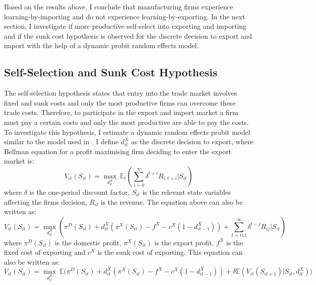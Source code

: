 \documentclass[12pt]{article}
\begin{document}
Based on the results above,  I conclude that manufacturing firms experience learning-by-importing and
do not experience learning-by-exporting. 
In the next section, I investigate if more productive self-select into
exporting and importing and if the sunk cost hypothesis is observed for
the discrete decision to export and import with the help of a dynamic probit
random effects model. 
\newpage
\subsection{Self-Selection and Sunk Cost Hypothesis }\label{sec:ss}
The self-selection hypothesis states that entry into the trade market
involves fixed and sunk costs and only the most productive firms can
overcome these trade costs. Therefore, to participate in the
export and import market a firm must pay a certain costs and only the most
productive are able to pay the costs. To investigate this hypothesis, I
estimate a dynamic random effects probit model similar to the model used
in \textcite{roberts1997decision}. I define $d_{it}^{X}$ as the discrete
decision to export, where
 Bellman equation for a profit maximising firm deciding to enter the
 export market is:
\begin{equation}
V_{it}(S_{it})= \underset{d_{it}^{X}}{\max}\:  \mathbb{E}_{t}(\sum_{i=0}^{\infty} \delta^{t+i}R_{i,t+i}|S_{it})
\end{equation}
 where $\delta$ is the one-period discount factor, $S_{it}$ is the
 relevant state variables affecting the firms decision, $R_{it}$ is
 the revenue. The equation above can also be written as:
\begin{equation}
V_{it}(S_{it})= \underset{d_{it}^{X}}{\max} (\pi^{D}(S_{it}) + d_{it}^{X}(\pi^{X}(S_{it})- f^{X} -
c^{X}(1-d_{it-1}^{X}))  + \sum_{t=t11}^{\infty} \delta^{t-j}R_{ij}|S_{it})
\end{equation}
where $\pi^{D}(S_{it})$ is the domestic profit, $\pi^{X}(S_{it})$ is the export
profit, $f^{X}$ is the fixed cost of exporting and $c^{X}$ is the sunk
cost of exporting. This equation can also be written as:
\begin{equation}
V_{it}(S_{it})= \underset{d_{it}^{X}}{\max} \:\mathbb{E}
\Big(\pi^{D}(S_{it}) + d_{it}^{X}(\pi^{X}(S_{it}) - f^{X} -
c^{X}(1-d_{it-1}^{X}))  + \delta \mathbb{E} (V_{it}(S_{it+1})|S_{it},
d_{it}^{X}) \Big)
\end{equation}
\end{document}
